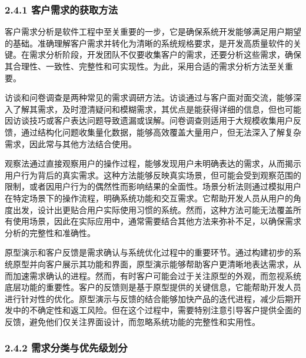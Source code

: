 \hypertarget{ux5ba2ux6237ux9700ux6c42ux7684ux83b7ux53d6ux65b9ux6cd5}{%
\subsubsection{2.4.1 客户需求的获取方法}\label{ux5ba2ux6237ux9700ux6c42ux7684ux83b7ux53d6ux65b9ux6cd5}}

客户需求分析是软件工程中至关重要的一步，它是确保系统开发能够满足用户期望的基础。准确理解客户需求并转化为清晰的系统规格要求，是开发高质量软件的关键。在需求分析阶段，开发团队不仅要收集客户的需求，还要分析这些需求，确保其合理性、一致性、完整性和可实现性。为此，采用合适的需求分析方法至关重要。


访谈和问卷调查是两种常见的需求调研方法。访谈通过与客户面对面交流，能够深入了解其需求，及时澄清疑问和模糊需求，其优点是能获得详细的信息，但也可能因访谈技巧或客户表达问题导致遗漏或误解。问卷调查则适用于大规模收集用户反馈，通过结构化问题收集量化数据，能够高效覆盖大量用户，但无法深入了解复杂需求，因此常与其他方法结合使用。


观察法通过直接观察用户的操作过程，能够发现用户未明确表达的需求，从而揭示用户行为背后的真实需求。这种方法能够反映真实场景，但可能会受到观察范围的限制，或者因用户行为的偶然性而影响结果的全面性。场景分析法则通过模拟用户在特定场景下的操作流程，明确系统功能和交互需求。它帮助开发人员从用户的角度出发，设计出更贴合用户实际使用习惯的系统。然而，这种方法可能无法覆盖所有使用场景，因此在实际应用中，通常需要结合其他方法来弥补不足，以确保需求分析的完整性和准确性。


原型演示和客户反馈是需求确认与系统优化过程中的重要环节。通过构建初步的系统原型并向客户展示其功能和界面，原型演示能够帮助客户更清晰地表达需求，从而加速需求确认的进程。然而，有时客户可能会过于关注原型的外观，而忽视系统底层功能的重要性。客户的反馈则是基于原型提供的关键信息，它能帮助开发人员进行针对性的优化。原型演示与反馈的结合能够加快产品的迭代进程，减少后期开发中的不确定性和返工风险。但在这个过程中，需要特别注意引导客户提供全面的反馈，避免他们仅关注界面设计，而忽略系统功能的完整性和实用性。

\hypertarget{ux9700ux6c42ux5206ux7c7bux4e0eux4f18ux5148ux7ea7ux5212ux5206}{%
\subsubsection{2.4.2 需求分类与优先级划分}\label{ux9700ux6c42ux5206ux7c7bux4e0eux4f18ux5148ux7ea7ux5212ux5206}}

